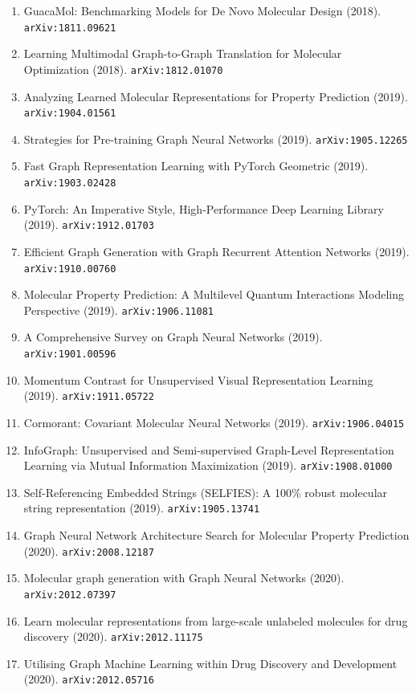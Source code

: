 \documentclass[11pt]{article}
\begin{document}
\begin{enumerate}
  Applications to Molecules (2018). \texttt{arXiv:1806.09206}
  \item GuacaMol: Benchmarking Models for De Novo Molecular Design (2018). \texttt{arXiv:1811.09621}
  \item Learning Multimodal Graph-to-Graph Translation for Molecular
  Optimization (2018). \texttt{arXiv:1812.01070}
  \item Analyzing Learned Molecular Representations for Property Prediction (2019). \texttt{arXiv:1904.01561}
  \item Strategies for Pre-training Graph Neural Networks (2019). \texttt{arXiv:1905.12265}
  \item Fast Graph Representation Learning with PyTorch Geometric (2019). \texttt{arXiv:1903.02428}
  \item PyTorch: An Imperative Style, High-Performance Deep Learning Library (2019). \texttt{arXiv:1912.01703}
  \item Efficient Graph Generation with Graph Recurrent Attention Networks (2019). \texttt{arXiv:1910.00760}
  \item Molecular Property Prediction: A Multilevel Quantum Interactions
  Modeling Perspective (2019). \texttt{arXiv:1906.11081}
  \item A Comprehensive Survey on Graph Neural Networks (2019). \texttt{arXiv:1901.00596}
  \item Momentum Contrast for Unsupervised Visual Representation Learning (2019). \texttt{arXiv:1911.05722}
  \item Cormorant: Covariant Molecular Neural Networks (2019). \texttt{arXiv:1906.04015}
  \item InfoGraph: Unsupervised and Semi-supervised Graph-Level Representation
  Learning via Mutual Information Maximization (2019). \texttt{arXiv:1908.01000}
  \item Self-Referencing Embedded Strings (SELFIES): A 100\% robust molecular
  string representation (2019). \texttt{arXiv:1905.13741}
  \item Graph Neural Network Architecture Search for Molecular Property
  Prediction (2020). \texttt{arXiv:2008.12187}
  \item Molecular graph generation with Graph Neural Networks (2020). \texttt{arXiv:2012.07397}
  \item Learn molecular representations from large-scale unlabeled molecules for
  drug discovery (2020). \texttt{arXiv:2012.11175}
  \item Utilising Graph Machine Learning within Drug Discovery and Development (2020). \texttt{arXiv:2012.05716}

\end{enumerate}
\end{document}
